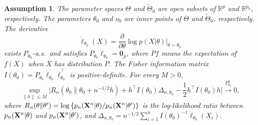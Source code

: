 \documentclass[11pt]{article}
\theoremstyle{plain}
\newtheorem{assumption}{\quad\quad Assumption}
\theoremstyle{definition}
\theoremstyle{remark}
\begin{document}
\begin{assumption}\label{Assumption1}
    The parameter spaces $\Theta$ and $\tilde{\Theta}_0$ are open subsets of $\mathbb{R}^p$ and $\mathbb{R}^{p_0}$, respectively.
    The parameters $\theta_0$ and $\nu_0$ are inner points of $\Theta$ and $\tilde{\Theta}_0$, respectively.
    The derivative 
$$\dot{\ell}_{\theta_0}(X)=\frac{\partial}{\partial \theta}\log p(X|\theta)\Big|_{\theta=\theta_0}$$
exists $P_{\theta_0}$-a.s.\ and satisfies $P_{\theta_0}\dot{\ell}_{\theta_0}=\mathbf{0}_p$, where $P f$ means the expectation of $f(X)$ when $X$ has distribution $P$.
The Fisher information matrix $I(\theta_0)=P_{\theta_0}\dot{\ell}_{\theta_0}\dot{\ell}_{\theta_0}^\top $ is positive-definite.
For every $M>0$,
    \begin{equation*}
        \sup_{\|h\|\leq M}\Big|
        R_n( \theta_0\|\theta_0 + n^{-1/2 }h )
        +h^\top  I(\theta_0)\Delta_{n,\theta_0}-\frac{1}{2}h^\top  I(\theta_0) h
         \Big|\xrightarrow{P^n_{\theta_0}}0,
    \end{equation*}
    where 
    $R_n (\theta\| \theta' )= \log \left\{ p_n(\mathbf{X}^{n}|\theta)/ p_n(\mathbf{X}^{n}|\theta') \right\}$ is the log-likelihood ratio between $p_n(\mathbf{X}^{n} | \theta )$ and $ p_n(\mathbf{X}^{n} | \theta' )$,
    and $\Delta_{n,\theta_0}=n^{-1/2}\sum_{i=1}^n I(\theta_0)^{-1}\dot{\ell}_{\theta_0}(X_i)$.
\end{assumption}     
\end{document}
